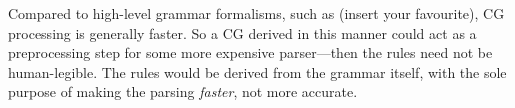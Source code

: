 \documentclass[11pt]{article}
\begin{document}
Compared to high-level grammar formalisms, such as (insert your favourite), CG processing
is generally faster. So a CG derived in this manner could act as a preprocessing step 
for some more expensive parser---then the rules need not be human-legible. 
The rules would be derived from the grammar itself, with the sole purpose of 
making the parsing \emph{faster}, not more accurate.











\end{document}
